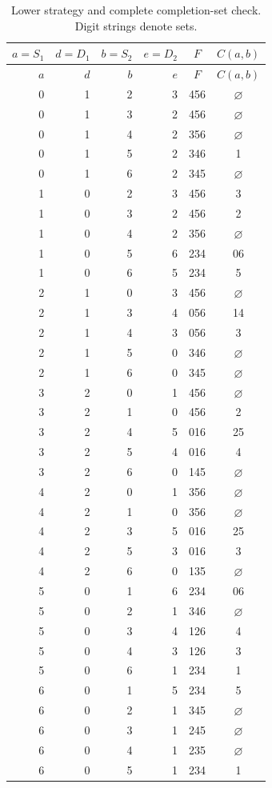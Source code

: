 \documentclass[11pt]{article}
\begin{document}
{\renewcommand{\arraystretch}{0.93}\begin{longtable}{rrrrcc}
\caption{Lower strategy and complete completion-set check. Digit strings denote sets.}\label{lower}\\
\toprule $a=S_1$&$d=D_1$&$b=S_2$&$e=D_2$&$F$&$C(a,b)$\\\midrule\endfirsthead
\toprule $a$&$d$&$b$&$e$&$F$&$C(a,b)$\\\midrule\endhead
0 & 1 & 2 & 3 & 456 & $\varnothing$ \\
0 & 1 & 3 & 2 & 456 & $\varnothing$ \\
0 & 1 & 4 & 2 & 356 & $\varnothing$ \\
0 & 1 & 5 & 2 & 346 & 1 \\
0 & 1 & 6 & 2 & 345 & $\varnothing$ \\
1 & 0 & 2 & 3 & 456 & 3 \\
1 & 0 & 3 & 2 & 456 & 2 \\
1 & 0 & 4 & 2 & 356 & $\varnothing$ \\
1 & 0 & 5 & 6 & 234 & 06 \\
1 & 0 & 6 & 5 & 234 & 5 \\
2 & 1 & 0 & 3 & 456 & $\varnothing$ \\
2 & 1 & 3 & 4 & 056 & 14 \\
2 & 1 & 4 & 3 & 056 & 3 \\
2 & 1 & 5 & 0 & 346 & $\varnothing$ \\
2 & 1 & 6 & 0 & 345 & $\varnothing$ \\
3 & 2 & 0 & 1 & 456 & $\varnothing$ \\
3 & 2 & 1 & 0 & 456 & 2 \\
3 & 2 & 4 & 5 & 016 & 25 \\
3 & 2 & 5 & 4 & 016 & 4 \\
3 & 2 & 6 & 0 & 145 & $\varnothing$ \\
4 & 2 & 0 & 1 & 356 & $\varnothing$ \\
4 & 2 & 1 & 0 & 356 & $\varnothing$ \\
4 & 2 & 3 & 5 & 016 & 25 \\
4 & 2 & 5 & 3 & 016 & 3 \\
4 & 2 & 6 & 0 & 135 & $\varnothing$ \\
5 & 0 & 1 & 6 & 234 & 06 \\
5 & 0 & 2 & 1 & 346 & $\varnothing$ \\
5 & 0 & 3 & 4 & 126 & 4 \\
5 & 0 & 4 & 3 & 126 & 3 \\
5 & 0 & 6 & 1 & 234 & 1 \\
6 & 0 & 1 & 5 & 234 & 5 \\
6 & 0 & 2 & 1 & 345 & $\varnothing$ \\
6 & 0 & 3 & 1 & 245 & $\varnothing$ \\
6 & 0 & 4 & 1 & 235 & $\varnothing$ \\
6 & 0 & 5 & 1 & 234 & 1 \\
\bottomrule\end{longtable}}
\end{document}
